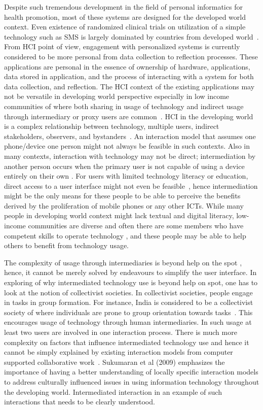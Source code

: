 Despite such tremendous development in the field of personal informatics for health promotion, most of these systems are designed for the developed world context. Even existence of randomized clinical trials on utilization of a simple technology such as SMS is largely dominated by countries from developed world~\citep{cole2010text}. From HCI point of view, engagement with personalized systems is currently considered to be more personal from data collection to reflection processes. These applications are personal in the essence of ownership of hardware, applications, data stored in application, and the process of interacting with a system for both data collection, and reflection. The HCI context of the existing applications may not be versatile in developing world perspective especially in low income communities of where  both sharing in usage of technology and indirect usage through intermediary or proxy users are common~\citep{kaplan2006can,sambasivan2010}. HCI in the developing world is a complex relationship between technology, multiple users, indirect stakeholders, observers, and bystanders~\citep{parikh2006}. An interaction model that assumes one phone/device one person might not always be feasible in such contexts. Also in many contexts, interaction with technology may not be direct; intermediation by another person occurs when the primary user is not capable of using a device entirely on their own \citep{sambasivan2010}. For users with limited technology literacy or education, direct access to a user interface might not even be feasible~\citep{parikh2006}, hence intermediation might be the only means for these people to be able to perceive the benefits derived by the proliferation of mobile phones or any other ICTs. While many people in developing world context might lack textual and digital literacy, low-income communities are diverse and often there are some members who have competent skills to operate technology \citep{sambasivan2010}, and these people may be able to help others to benefit from technology usage.

The complexity of usage through intermediaries is beyond help on the spot \citep{sambasivan2010}, hence, it cannot be merely solved by endeavours to simplify the user interface. In exploring of why intermediated technology use is beyond help on spot, one has to look at the notion of collectivist societies. In collectivist societies, people engage in tasks in group formation. For instance, India is considered to be a collectivist society of where individuals are prone to group orientation towards tasks~\citep{parikh2006}. This encourages usage of technology through human intermediaries. In such usage at least two users are involved in one interaction process. There is much more complexity on factors that influence intermediated technology use and hence it cannot be simply explained by existing interaction models from computer supported collaborative work~\citep{parikh2006}. Sukumaran et al (2009) emphasizes the importance of having a better understanding of locally specific interaction models to address culturally influenced issues in using information technology throughout the developing world. Intermediated interaction in an example of such interactions that needs to be clearly understood.

